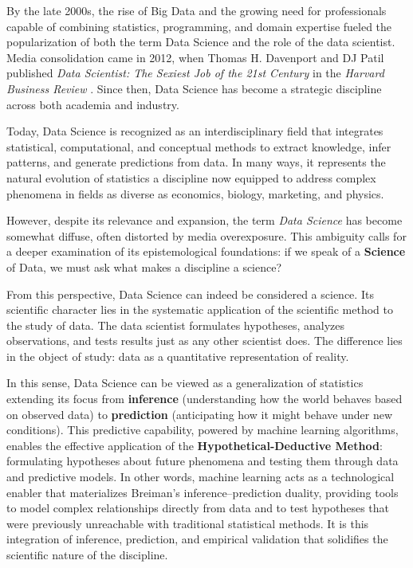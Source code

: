 \documentclass[
  12pt,
  letterpaper,
]{book}
\begin{document}
By the late 2000s, the rise of Big Data and the growing need for
professionals capable of combining statistics, programming, and domain
expertise fueled the popularization of both the term Data Science and
the role of the data scientist. Media consolidation came in 2012, when
Thomas H. Davenport and DJ Patil published \emph{Data Scientist: The
Sexiest Job of the 21st Century} in the \emph{Harvard Business Review}
. Since then, Data Science has
become a strategic discipline across both academia and industry.

Today, Data Science is recognized as an interdisciplinary field that
integrates statistical, computational, and conceptual methods to extract
knowledge, infer patterns, and generate predictions from data. In many
ways, it represents the natural evolution of statistics a discipline now
equipped to address complex phenomena in fields as diverse as economics,
biology, marketing, and physics.

However, despite its relevance and expansion, the term \emph{Data
Science} has become somewhat diffuse, often distorted by media
overexposure. This ambiguity calls for a deeper examination of its
epistemological foundations: if we speak of a \textbf{Science} of Data,
we must ask what makes a discipline a science?

From this perspective, Data Science can indeed be considered a science.
Its scientific character lies in the systematic application of the
scientific method to the study of data. The data scientist formulates
hypotheses, analyzes observations, and tests results just as any other
scientist does. The difference lies in the object of study: data as a
quantitative representation of reality.

In this sense, Data Science can be viewed as a generalization of
statistics extending its focus from \textbf{inference} (understanding
how the world behaves based on observed data) to \textbf{prediction}
(anticipating how it might behave under new conditions). This predictive
capability, powered by machine learning algorithms, enables the
effective application of the \textbf{Hypothetical-Deductive Method}:
formulating hypotheses about future phenomena and testing them through
data and predictive models. In other words, machine learning acts as a
technological enabler that materializes Breiman's inference--prediction
duality, providing tools to model complex relationships directly from
data and to test hypotheses that were previously unreachable with
traditional statistical methods. It is this integration of inference,
prediction, and empirical validation that solidifies the scientific
nature of the discipline.
\end{document}
